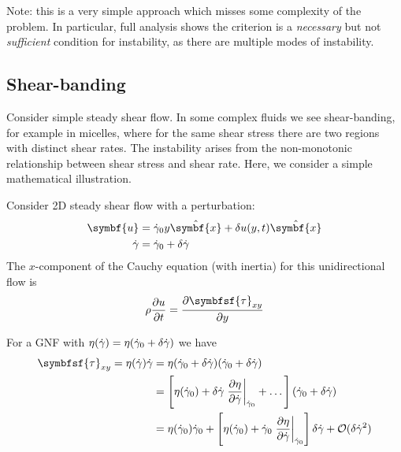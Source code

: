 \documentclass{jknotes}
\begin{document}
Note: this is a very simple approach which misses some complexity of the
problem. In particular, full analysis shows the criterion is a \emph{necessary}
but not \emph{sufficient} condition for instability, as there are multiple
modes of instability.

\subsection{Shear-banding}
Consider simple steady shear flow. In some complex fluids we see
shear-banding, for example in micelles, where for the same shear stress there
are two regions with distinct shear rates. The instability arises from the
non-monotonic relationship between shear stress and shear rate. Here, we
consider a simple mathematical illustration.

\begin{center}
\end{center}

Consider 2D steady shear flow with a perturbation:
\begin{align}
	\symbf{u} &= \srate_0 y \hat{\symbf{x}} + \delta u(y,t) \hat{\symbf{x}} \\
	\srate &= \srate_0 + \delta \srate \\
\end{align}
The $x$-component of the Cauchy equation (with inertia) for this
unidirectional flow is
\begin{equation}
	\rho \frac{\partial u}{\partial t} = \frac{\partial
	\symbfsf{\tau}_{xy}}{\partial y}
\end{equation}

For a GNF with $\eta(\dot{\gamma}) = \eta(\dot{\gamma}_0 + \delta \dot{\gamma})$ we have
\begin{align}
	\symbfsf{\tau}_{xy} = \eta(\srate) \srate &= \eta(\srate_0 +
	\delta\srate)(\srate_0 + \delta\srate) \\
	&= \left[ \eta(\srate_0) + \delta \srate \left.\frac{\partial \eta}{\partial
	\srate}\right|_{\srate_0} + \dots \right](\srate_0+\delta\srate) \\
	&= \eta(\srate_0)\srate_0 + \left[ \eta(\srate_0) +
	\srate_0\left.\frac{\partial \eta}{\partial
	\srate}\right|_{\srate_0}\right] \delta \srate + \mathcal{O}(\delta
	\srate^2)
\end{align}
\end{document}
